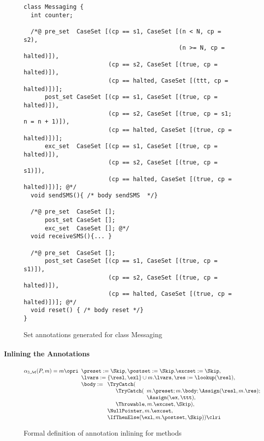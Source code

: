 \begin{figure}[t]
\begin{verbatim}
class Messaging {
  int counter;
  
  /*@ pre_set  CaseSet [(cp == s1, CaseSet [(n < N, cp = s2),
                                            (n >= N, cp = halted)]),
                        (cp == s2, CaseSet [(true, cp = halted)]),
                        (cp == halted, CaseSet [(ttt, cp = halted)])];
      post_set CaseSet [(cp == s1, CaseSet [(true, cp = halted)]),
                        (cp == s2, CaseSet [(true, cp = s1; n = n + 1)]),
                        (cp == halted, CaseSet [(true, cp = halted)])];
      exc_set  CaseSet [(cp == s1, CaseSet [(true, cp = halted)]),
                        (cp == s2, CaseSet [(true, cp = s1)]),
                        (cp == halted, CaseSet [(true, cp = halted)])]; @*/
  void sendSMS(){ /* body sendSMS  */}

  /*@ pre_set  CaseSet [];
      post_set CaseSet [];
      exc_set  CaseSet []; @*/ 
  void receiveSMS(){... }

  /*@ pre_set  CaseSet [];
      post_set CaseSet [(cp == s1, CaseSet [(true, cp = s1)]),
                        (cp == s2, CaseSet [(true, cp = halted)]),
                        (cp == halted, CaseSet [(true, cp = halted)])]; @*/
  void reset() { /* body reset */}
}
\end{verbatim}
\caption{Set annotations generated for class Messaging}\label{FigExampleImplem}
\end{figure}



\paragraph{Inlining the Annotations}

\begin{figure}[t]
\[
\alpha_{3, \mathcal{M}}(P, m) = m \opri
\begin{array}[t]{l}
\preset := \Skip, \postset := \Skip. \excset := \Skip,\\
\lvars := \{\resl, \exl\} \cup m.\lvars, 
\res := \lookup(\resl), \\
\body := 
\begin{array}[t]{l}
\TryCatch(\\
\quad \begin{array}[t]{l}
  \TryCatch(
  \begin{array}[t]{l}
   m.\preset; m.\body; \Assign(\resl, m.\res); \\
   \Assign(\ex, \ttt),
  \end{array}\\
  \Throwable, m.\excset, \Skip),
\end{array}\\
\NullPointer, m.\excset,\\
\IfThenElse(\exl, m.\postset, \Skip)) \clri
\end{array}
\end{array}
\]
\caption{Formal definition of annotation inlining for methods}
\end{figure}

